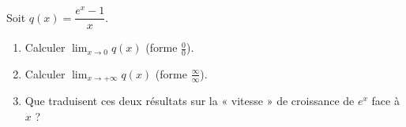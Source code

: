 \documentclass[11pt,a4paper]{article}
\begin{document}
\begin{exercice}
Soit $q(x)=\dfrac{e^x-1}{x}$.
\begin{enumerate}[label=\alph*),leftmargin=2em,itemsep=3pt]
  \item Calculer $\displaystyle\lim_{x\to 0} q(x)$ (forme $\frac00$).
  \item Calculer $\displaystyle\lim_{x\to+\infty} q(x)$ (forme $\frac{\infty}{\infty}$).
  \item Que traduisent ces deux résultats sur la « vitesse » de croissance de $e^x$ face à $x$ ?
\end{enumerate}
\end{exercice}
\end{document}
